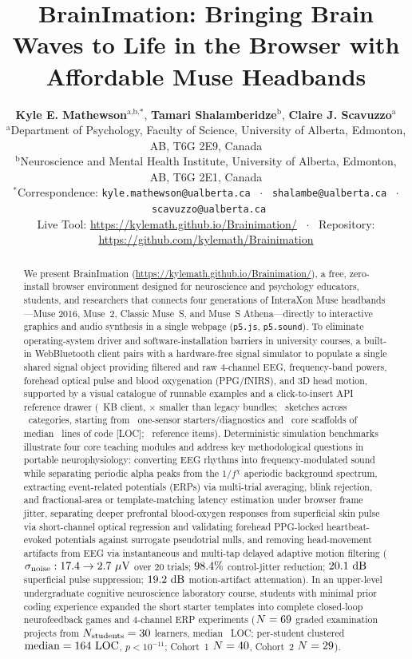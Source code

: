 \documentclass[11pt]{article}
\title{\textbf{BrainImation: Bringing Brain Waves to Life in the Browser with Affordable Muse Headbands}}
\author{
\parbox{0.94\textwidth}{\centering
\textbf{Kyle E. Mathewson}$^{\text{a,b,*}}$, \textbf{Tamari Shalamberidze}$^{\text{b}}$, \textbf{Claire J. Scavuzzo}$^{\text{a}}$\\[5pt]
\footnotesize $^{\text{a}}$Department of Psychology, Faculty of Science, University of Alberta, Edmonton, AB, T6G 2E9, Canada\\
\footnotesize $^{\text{b}}$Neuroscience and Mental Health Institute, University of Alberta, Edmonton, AB, T6G 2E1, Canada\\
\footnotesize $^*$Correspondence: \texttt{kyle.mathewson@ualberta.ca} \ $\cdot$ \ \texttt{shalambe@ualberta.ca} \ $\cdot$ \ \texttt{scavuzzo@ualberta.ca}\\
\footnotesize Live Tool: \url{https://kylemath.github.io/Brainimation/} \ $\cdot$ \ Repository: \url{https://github.com/kylemath/Brainimation}
}
}
\date{}
\begin{document}
\maketitle

\begin{abstract}
We present BrainImation (\url{https://kylemath.github.io/Brainimation/}), a free, zero-install browser environment designed for neuroscience and psychology educators, students, and researchers that connects four generations of InteraXon Muse headbands---Muse 2016, Muse~2, Classic Muse~S, and Muse~S Athena---directly to interactive graphics and audio synthesis in a single webpage (\texttt{p5.js}, \texttt{p5.sound}). To eliminate operating-system driver and software-installation barriers in university courses, a built-in WebBluetooth client pairs with a hardware-free signal simulator to populate a single shared signal object providing filtered and raw 4-channel EEG, frequency-band powers, forehead optical pulse and blood oxygenation (PPG/fNIRS), and 3D head motion, supported by a visual catalogue of runnable examples and a click-to-insert API reference drawer (\MuseBrowserKB~KB client, \BundleReductionFactor$\times$ smaller than legacy bundles; \NCatalogueSketches\ sketches across \NCatalogueCategories\ categories, starting from \NStarterDiag\ one-sensor starters/diagnostics and \NBuiltinExamples\ core scaffolds of median \ExLOCMedian\ lines of code [LOC]; \NRefAPIs\ reference items). Deterministic simulation benchmarks illustrate four core teaching modules and address key methodological questions in portable neurophysiology: converting EEG rhythms into frequency-modulated sound while separating periodic alpha peaks from the $1/f^{\chi}$ aperiodic background spectrum, extracting event-related potentials (ERPs) via multi-trial averaging, blink rejection, and fractional-area or template-matching latency estimation under browser frame jitter, separating deeper prefrontal blood-oxygen responses from superficial skin pulse via short-channel optical regression and validating forehead PPG-locked heartbeat-evoked potentials against surrogate pseudotrial nulls, and removing head-movement artifacts from EEG via instantaneous and multi-tap delayed adaptive motion filtering ($\sigma_{\text{noise}}: 17.4 \rightarrow 2.7\ \mu\text{V}$ over 20 trials; $98.4\%$ control-jitter reduction; $20.1\text{ dB}$ superficial pulse suppression; $19.2\text{ dB}$ motion-artifact attenuation). In an upper-level undergraduate cognitive neuroscience laboratory course, students with minimal prior coding experience expanded the short starter templates into complete closed-loop neurofeedback games and 4-channel ERP experiments ($N = 69$ graded examination projects from $N_{\text{students}} = 30$ learners, median \StuLOCMedian\ LOC; per-student clustered $\text{median} = 164\text{ LOC}$, $p < 10^{-11}$; Cohort~1 $N = 40$, Cohort~2 $N = 29$).\\[4pt]

\end{abstract}
\end{document}
